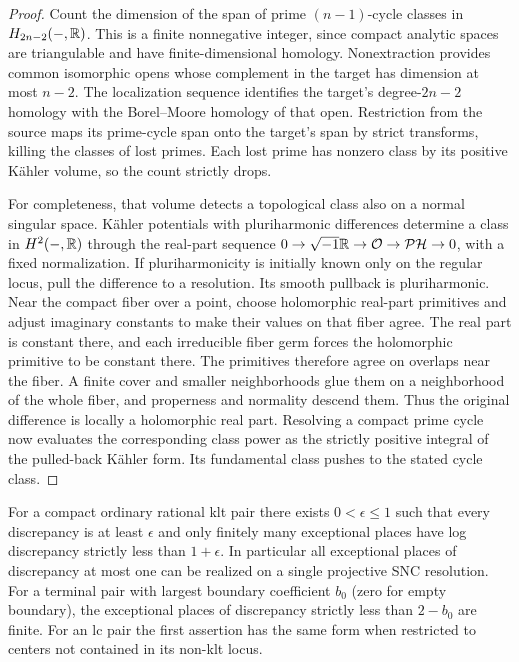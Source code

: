 \begin{proof}
Count the dimension of the span of prime $(n-1)$-cycle classes in
$H_{2n-2}(-,\mathbb{R})$.  This is a finite nonnegative integer, since compact
analytic spaces are triangulable and have finite-dimensional homology.
Nonextraction provides common isomorphic opens whose complement in
the target has dimension at most $n-2$.  The localization sequence
identifies the target's degree-$2n-2$ homology with the Borel--Moore
homology of that open.  Restriction from the source maps its prime-cycle
span onto the target's span by strict transforms, killing the classes
of lost primes.  Each lost prime has nonzero class by its positive
K\"ahler volume, so the count strictly drops.

For completeness, that volume detects a topological class also on a
normal singular space.  K\"ahler potentials with pluriharmonic
differences determine a class in $H^2(-,\mathbb{R})$ through the real-part
sequence
$0\to\sqrt{-1}\mathbb{R}\to\mathcal{O}\to\mathcal{PH}\to0$, with a fixed normalization.
If pluriharmonicity is initially known only on the regular locus,
pull the difference to a resolution.  Its smooth pullback is
pluriharmonic.  Near the compact fiber over a point, choose holomorphic
real-part primitives and adjust imaginary constants to make their
values on that fiber agree.  The real part is constant there, and
each irreducible fiber germ forces the holomorphic primitive to be
constant there.  The primitives therefore agree on overlaps near
the fiber.  A finite cover and smaller neighborhoods glue them on a
neighborhood of the whole fiber, and properness and normality descend
them.  Thus the original difference is locally a holomorphic real
part.  Resolving a compact prime cycle now evaluates the corresponding
class power as the strictly positive integral of the pulled-back
K\"ahler form.  Its fundamental class pushes to the stated cycle
class.
\end{proof}

\begin{lemma}
\label{bir:low-count}
For a compact ordinary rational klt pair there exists
$0<\epsilon\leq1$ such that every discrepancy is at least $\epsilon$
and only finitely many exceptional places have log discrepancy
strictly less than $1+\epsilon$.  In particular all exceptional places
of discrepancy at most one can be realized on a single projective
SNC resolution.  For a terminal pair with largest boundary
coefficient $b_0$ (zero for empty boundary), the exceptional places
of discrepancy strictly less than $2-b_0$ are finite.  For an lc
pair the first assertion has the same form when restricted to
centers not contained in its non-klt locus.
\end{lemma}

